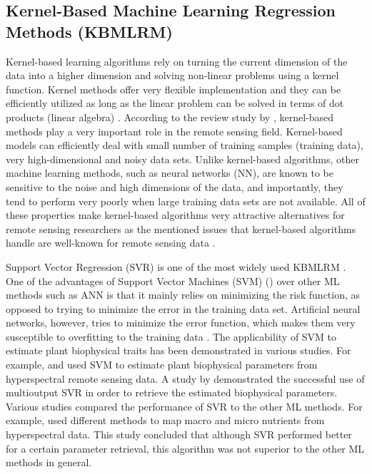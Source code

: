 \documentclass[a4paper, twoside]{templates/ociamthesis}
\begin{document}
\hypertarget{kernel}{%
\subsection{Kernel-Based Machine Learning Regression Methods (KBMLRM)}\label{kernel}}

Kernel-based learning algorithms rely on turning the current dimension of the data into a higher dimension and solving non-linear problems using a kernel function. Kernel methods offer very flexible implementation and they can be efficiently utilized as long as the linear problem can be solved in terms of dot products (linear algebra) \citep{verrelst2019quantifying}. According to the review study by \citet{gomez2011review}, kernel-based methods play a very important role in the remote sensing field. Kernel-based models can efficiently deal with small number of training samples (training data), very high-dimensional and noisy data sets. Unlike kernel-based algorithms, other machine learning methods, such as neural networks (NN), are known to be sensitive to the noise and high dimensions of the data, and importantly, they tend to perform very poorly when large training data sets are not available. All of these properties make kernel-based algorithms very attractive alternatives for remote sensing researchers as the mentioned issues that kernel-based algorithms handle are well-known for remote sensing data \citep{gomez2011review}.

Support Vector Regression (SVR) \citep{drucker1997support} is one of the most widely used KBMLRM \citep{verrelst2019quantifying}. One of the advantages of Support Vector Machines (SVM) (\citet{boser1992training}) over other ML methods such as ANN is that it mainly relies on minimizing the risk function, as opposed to trying to minimize the error in the training data set. Artificial neural networks, however, tries to minimize the error function, which makes them very susceptible to overfitting to the training data \citep{karimi2008application}. The applicability of SVM to estimate plant biophysical traits has been demonstrated in various studies. For example, \citet{karimi2008application} and \citet{yang2011estimating} used SVM to estimate plant biophysical parameters from hyperspectral remote sensing data. A study by \citet{tuia2011multioutput} demonstrated the successful use of multioutput SVR in order to retrieve the estimated biophysical parameters. Various studies compared the performance of SVR to the other ML methods. For example, \citet{pullanagari2016mapping} used different methods to map macro and micro nutrients from hyperspectral data. This study concluded that although SVR performed better for a certain parameter retrieval, this algorithm was not superior to the other ML methods in general.
\end{document}
